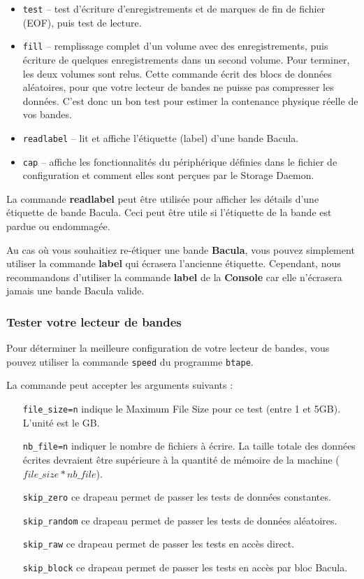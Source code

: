 \begin{itemize}
\item {\tt test} -- test d'écriture d'enregistrements et de marques de fin de
    fichier (EOF), puis test de lecture.  
\item {\tt fill} -- remplissage complet d'un volume avec des enregistrements, 
    puis écriture de quelques enregistrements dans un second volume. Pour 
    terminer,  les deux volumes sont relus.
    Cette commande écrit des blocs de données aléatoires, pour que votre lecteur
    de bandes ne puisse pas compresser les données. C'est donc un bon test pour
    estimer la contenance physique réelle de vos bandes.
\item {\tt readlabel} -- lit et affiche l'étiquette (label) d'une bande Bacula.  
\item {\tt cap} -- affiche les fonctionnalités du périphérique définies dans le
    fichier de configuration et comment elles sont perçues par le Storage 
    Daemon.
   \end{itemize}

La commande {\bf readlabel} peut être utilisée pour afficher les détails d'une 
étiquette de bande Bacula. Ceci peut être utile si l'étiquette de la bande est
pardue ou endommagée.

Au cas où vous souhaitiez re-étiquer une bande {\bf Bacula}, vous pouvez 
simplement utiliser la commande {\bf label} qui écrasera l'ancienne étiquette.
Cependant, nous recommandons d'utiliser la commande {\bf label} de la 
{\bf Console} car elle n'écrasera jamais une bande Bacula valide.


\subsubsection*{Tester votre lecteur de bandes}
\label{sec:btapespeed}

Pour déterminer la meilleure configuration de votre lecteur de bandes, vous 
pouvez utiliser la commande \texttt{speed} du programme \texttt{btape}.

La commande peut accepter les arguments suivants :
\begin{itemize}
\item[\texttt{file\_size=n}] indique le Maximum File Size pour ce test (entre 1
    et 5GB). L'unité est le GB.
\item[\texttt{nb\_file=n}] indiquer le nombre de fichiers à écrire. La taille 
    totale des données écrites devraient être supérieure à la quantité de 
    mémoire de la machine ($file\_size*nb\_file$).
\item[\texttt{skip\_zero}] ce drapeau permet de passer les tests de données
    constantes.
\item[\texttt{skip\_random}] ce drapeau permet de passer les tests de données
    aléatoires.
\item[\texttt{skip\_raw}] ce drapeau permet de passer les tests en accès direct.
\item[\texttt{skip\_block}] ce drapeau permet de passer les tests en accès par 
    bloc Bacula.
\end{itemize}

